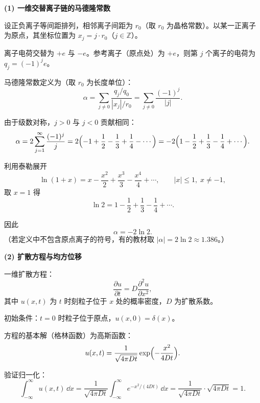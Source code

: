 \begin{derivationbox}[标准解题过程]
\textbf{(1) 一维交替离子链的马德隆常数}

设正负离子等间距排列，相邻离子间距为 $r_0$（取 $r_0$ 为晶格常数）。以某一正离子为原点，其坐标位置为 $x_j=j\cdot r_0$（$j\in\mathbb{Z}$）。

离子电荷交替为 $+e$ 与 $-e$。参考离子（原点处）为 $+e$，则第 $j$ 个离子的电荷为 $q_j=(-1)^j e$。

马德隆常数定义为（取 $r_0$ 为长度单位）：
\begin{equation}
\alpha=\sum_{j\neq0}\frac{q_j/q_0}{|x_j|/r_0}
=\sum_{j\neq0}\frac{(-1)^j}{|j|}.
\end{equation}

由于级数对称，$j>0$ 与 $j<0$ 贡献相同：
\begin{equation}
\alpha=2\sum_{j=1}^{\infty}\frac{(-1)^j}{j}
=2\Bigl(-1+\frac{1}{2}-\frac{1}{3}+\frac{1}{4}-\cdots\Bigr)
=-2\Bigl(1-\frac{1}{2}+\frac{1}{3}-\frac{1}{4}+\cdots\Bigr).
\end{equation}

利用泰勒展开
\begin{equation}
\ln(1+x)=x-\frac{x^2}{2}+\frac{x^3}{3}-\frac{x^4}{4}+\cdots,
\qquad |x|\le1,\;x\neq-1,
\end{equation}
取 $x=1$ 得
\begin{equation}
\ln2=1-\frac{1}{2}+\frac{1}{3}-\frac{1}{4}+\cdots.
\end{equation}

因此
\begin{equation}
\boxed{\alpha=-2\ln2.}
\end{equation}
（若定义中不包含原点离子的符号，有的教材取 $|\alpha|=2\ln2\approx1.386$。）

\textbf{(2) 扩散方程与均方位移}

一维扩散方程：
\begin{equation}
\frac{\partial u}{\partial t}=D\frac{\partial^2 u}{\partial x^2},
\end{equation}
其中 $u(x,t)$ 为 $t$ 时刻粒子位于 $x$ 处的概率密度，$D$ 为扩散系数。

初始条件：$t=0$ 时粒子位于原点，$u(x,0)=\delta(x)$。

方程的基本解（格林函数）为高斯函数：
\begin{equation}
u(x,t)=\frac{1}{\sqrt{4\pi Dt}}\exp\Bigl(-\frac{x^2}{4Dt}\Bigr).
\end{equation}

验证归一化：
\begin{equation}
\int_{-\infty}^{\infty}u(x,t)\,\dd x
=\frac{1}{\sqrt{4\pi Dt}}\int_{-\infty}^{\infty}e^{-x^2/(4Dt)}\,\dd x
=\frac{1}{\sqrt{4\pi Dt}}\cdot\sqrt{4\pi Dt}=1.
\end{equation}


\end{derivationbox}
